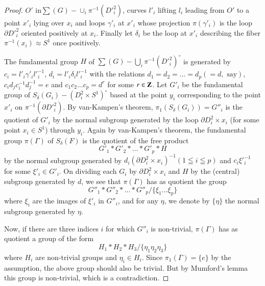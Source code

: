 \begin{proof}
\noindent
$O'$ in\pageoriginale $\sum (G) - \cup_i \pi^{-1} (D'^2_i)$, curves $l'_i$ lifting $l_i$ leading from $O'$ to a point $x'_i$ lying over $x_i$ and loops $\gamma'_i$ at $x'_i$ whose projection $\pi (\gamma'_i)$ is the loop $\partial D'^2_i$ oriented positively at $x_i$. Finally let $\delta_i$ be the loop at $x'_i$ describing the fiber $\pi^{-1} (x_i) \approx S^1$ once positively.

The fundamental group $H$ of $\sum (G) - \bigcup_i\pi^{-1} (D'^2_i)^\circ$ is generated by $c_i = l'_i \gamma'_i l'^{-1}_{i}$, $d_i = l'_i \delta_i l'^{-1}_i$ with the relations $d_1 = d_2 = \ldots = d_p (=d, \text{ say})$, $c_i d_j c^{-1}_i d^{-1}_j =e$ and $c_1 c_2 \ldots c_p = d^r$ for some $r \in \mathbf{Z}$. Let $G'_i$ be the fundamental group of $S_\delta (G_i) - (D^2_i \times S^1)^\circ$ based at the point $y_i$ corresponding to the point $x'_i$ on $\pi^{-1} (\partial D'^2_i)$. By van-Kampen's theorem, $\pi_1 (S_\delta (G_i)) = G''_i$ is the quotient of $G'_i$ by the normal subgroup generated by the loop $\partial D^2_i \times x_i$ (for some point $x_i \in S^1$) through $y_i$. Again by van-Kampen's theorem, the fundamental group $\pi (\Gamma)$ of $S_\delta (F)$ is the quotient of the free product
$$
G'_1 * G'_2 * \ldots * G'_p * H
$$
by the normal subgroup generated by $d_i (\partial D^2_i \times x_i)^{-1} (1\leqq i \leqq p)$ and $c_i \xi'^{-1}_i$ for some $\xi'_i \in G'_i$. On dividing each $G_i$ by $\partial D^2_i \times x_i$ and $H$ by the (central) subgroup generated by $d$, we see that $\pi (\Gamma)$ has as quotient the group
$$
G''_1 * G''_2 * \ldots * G''_p / \{\xi_1 \ldots \xi_p\}
$$
where $\xi_i$ are the images of $\xi'_i$ in $G''_i$, and for any $\eta$, we denote by $\{\eta\}$ the normal subgroup generated by $\eta$.

Now, if there are three indices $i$ for which $G''_i$ is non-trivial, $\pi(\Gamma)$ has as quotient a group of the form
$$
H_1 * H_2 * H_3 /\{\eta_1 \eta_2 \eta_3\}
$$
where $H_i$ are non-trivial groups and $\eta_i \in H_i$. Since $\pi_1 (\Gamma) = \{e\}$ by the assumption, the above group should also be trivial. But by Mumford's lemma \cite{art8-key2} this group is non-trivial, which is a contradiction.
\end{proof}

